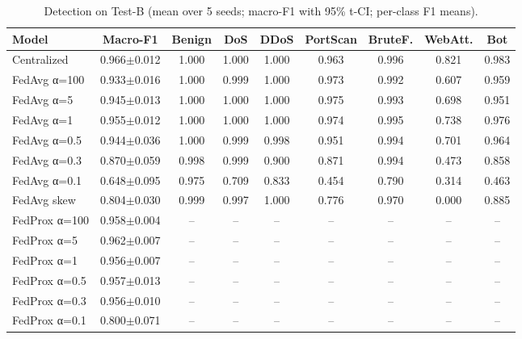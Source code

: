 \begin{table}[t]
\centering
\caption{Detection on Test-B (mean over 5 seeds; macro-F1 with 95\% t-CI; per-class F1 means).}
\label{tab:detection}
\scriptsize
\setlength{\tabcolsep}{3pt}
\begin{tabular}{lcccccccc}
\toprule
Model & Macro-F1 & Benign & DoS & DDoS & PortScan & BruteF. & WebAtt. & Bot \\
\midrule
Centralized & 0.966$\pm$0.012 & 1.000 & 1.000 & 1.000 & 0.963 & 0.996 & 0.821 & 0.983 \\
\midrule
FedAvg α=100 & 0.933$\pm$0.016 & 1.000 & 0.999 & 1.000 & 0.973 & 0.992 & 0.607 & 0.959 \\
FedAvg α=5 & 0.945$\pm$0.013 & 1.000 & 1.000 & 1.000 & 0.975 & 0.993 & 0.698 & 0.951 \\
FedAvg α=1 & 0.955$\pm$0.012 & 1.000 & 1.000 & 1.000 & 0.974 & 0.995 & 0.738 & 0.976 \\
FedAvg α=0.5 & 0.944$\pm$0.036 & 1.000 & 0.999 & 0.998 & 0.951 & 0.994 & 0.701 & 0.964 \\
FedAvg α=0.3 & 0.870$\pm$0.059 & 0.998 & 0.999 & 0.900 & 0.871 & 0.994 & 0.473 & 0.858 \\
FedAvg α=0.1 & 0.648$\pm$0.095 & 0.975 & 0.709 & 0.833 & 0.454 & 0.790 & 0.314 & 0.463 \\
FedAvg skew & 0.804$\pm$0.030 & 0.999 & 0.997 & 1.000 & 0.776 & 0.970 & 0.000 & 0.885 \\
\midrule
FedProx α=100 & 0.958$\pm$0.004 & -- & -- & -- & -- & -- & -- & -- \\
FedProx α=5 & 0.962$\pm$0.007 & -- & -- & -- & -- & -- & -- & -- \\
FedProx α=1 & 0.956$\pm$0.007 & -- & -- & -- & -- & -- & -- & -- \\
FedProx α=0.5 & 0.957$\pm$0.013 & -- & -- & -- & -- & -- & -- & -- \\
FedProx α=0.3 & 0.956$\pm$0.010 & -- & -- & -- & -- & -- & -- & -- \\
FedProx α=0.1 & 0.800$\pm$0.071 & -- & -- & -- & -- & -- & -- & -- \\
\bottomrule
\end{tabular}
\end{table}
